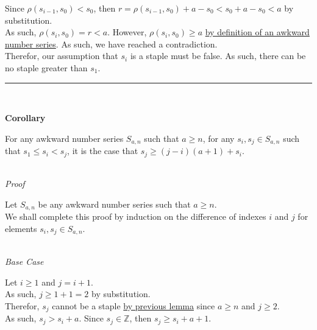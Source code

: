 \documentclass[a4paper,12pt]{article}
\begin{document}
\noindent Since $\rho(s_{i - 1}, s_0) < s_0$, then $r = \rho(s_{i - 1}, s_0) + a - s_0 < s_0 + a - s_0 < a$ by substitution.\\

\noindent As such, $\rho(s_i, s_0) = r < a$. However, $\rho(s_i, s_0) \geq a$ \hyperlink{definition:awkward_number_series}{by definition of an awkward number series}. As such, we have reached a contradiction.\\

\noindent Therefor, our assumption that $s_i$ is a staple must be false. As such, there can be no staple greater than $s_1$.


\begin{center}
\noindent\rule{8cm}{0.4pt}
\end{center}
\noindent \\







\label{corollary:min_length_one_staple}
\hypertarget{corollary:min_length_one_staple}{}
\begin{tcolorbox}
\textbf{Corollary}

\noindent For any awkward number series $S_{a,n}$ such that $a \geq n$, for any $s_i, s_j \in S_{a, n}$ such that $s_1 \leq s_i < s_j$, it is the case that $s_j \geq (j - i)(a + 1) + s_i$.

\end{tcolorbox}

\noindent \\
\textit{Proof}

\noindent Let $S_{a, n}$ be any awkward number series such that $a \geq n$.\\

\noindent We shall complete this proof by induction on the difference of indexes $i$ and $j$ for elements $s_i, s_j \in S_{a, n}$.

\noindent \\
\textit{Base Case}

\noindent Let $i \geq 1$ and $j = i + 1$.\\

\noindent As such, $j \geq 1 + 1 = 2$ by substitution.\\

\noindent Therefor, $s_j$ cannot be a staple \hyperlink{lemma:only_staple}{by previous lemma} since $a \geq n$ and $j \geq 2$.\\

\noindent As such, $s_j > s_i + a$. Since $s_j \in \mathbb{Z}$, then $s_j \geq s_i + a + 1$.\\
\end{document}
